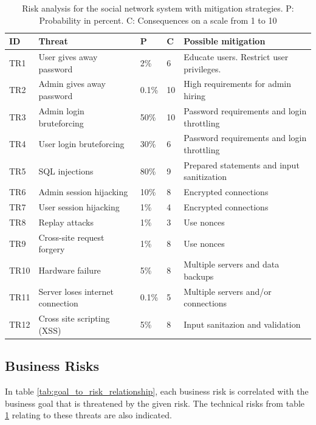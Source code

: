 \documentclass[a4paper]{article}
\begin{document}
\begin{table}[h]
	\begin{tabular}{| l | p{4cm} | l | l | p{5cm} |}
		\hline
		\textbf{ID} & \textbf{Threat} & \textbf{P} & \textbf{C} & \textbf{Possible mitigation} \\ \hline
		TR1 & User gives away password & 2\% & 6 & Educate users. Restrict user privileges. \\ \hline
        TR2 & Admin gives away password & 0.1\%  & 10 & High requirements for admin hiring \\ \hline
        TR3 & Admin login bruteforcing & 50\% & 10 & Password requirements and login throttling \\ \hline
        TR4 & User login bruteforcing & 30\% & 6 & Password requirements and login throttling \\ \hline
        TR5 & SQL injections & 80\% & 9 & Prepared statements and input sanitization \\ \hline
        TR6 & Admin session hijacking & 10\% & 8 & Encrypted connections \\ \hline
        TR7 & User session hijacking & 1\% & 4 & Encrypted connections \\ \hline
        TR8 & Replay attacks & 1\% & 3 & Use nonces \\ \hline
       	TR9 & Cross-site request forgery & 1\% & 8 & Use nonces \\ \hline
        TR10 & Hardware failure & 5\% & 8 & Multiple servers and data backups \\ \hline
        TR11 & Server loses internet connection & 0.1\% & 5 & Multiple servers and/or connections \\ \hline
        TR12 & Cross site scripting (XSS) & 5\% & 8 & Input sanitazion and validation \\ \hline
	\end{tabular}
	\caption{Risk analysis for the social network system with mitigation strategies. P: Probability in percent. C: Consequences on a scale from 1 to 10}
	\label{tab:risk_analysis}
\end{table}

\subsection{Business Risks}
In table \ref{tab:goal_to_risk_relationship}, each business risk is correlated with the business goal that is threatened by the given risk. The technical risks from table \ref{tab:risk_analysis} relating to these threats are also indicated.
\end{document}
